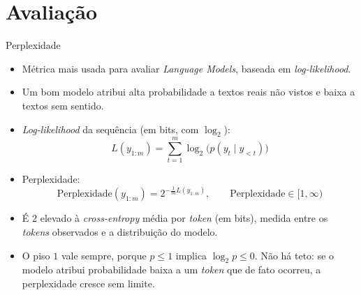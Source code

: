 \documentclass[aspectratio=169,xcolor=dvipsnames]{beamer}
\begin{document}
\section{Avaliação}

\begin{frame}{Perplexidade}
\begin{itemize}
    \item Métrica mais usada para avaliar \textit{Language Models}, baseada em \textit{log-likelihood}.
    \item Um bom modelo atribui alta probabilidade a textos reais não vistos e baixa a textos sem sentido.
    \item \textit{Log-likelihood} da sequência (em bits, com $\log_2$):
    \begin{equation*}
        L(y_{1:m}) = \sum_{t=1}^{m} \log_2\bigl(p(y_t \mid y_{<t})\bigr)
    \end{equation*}
    \item Perplexidade:
    \begin{equation*}
        \text{Perplexidade}(y_{1:m}) = 2^{-\frac{1}{m} L(y_{1:m})}, \qquad \text{Perplexidade} \in [1, \infty)
    \end{equation*}
    \item É $2$ elevado à \textit{cross-entropy} média por \textit{token} (em bits), medida entre os \textit{tokens} observados e a distribuição do modelo.
    \item O piso $1$ vale sempre, porque $p \le 1$ implica $\log_2 p \le 0$. Não há teto: se o modelo atribui probabilidade baixa a um \textit{token} que de fato ocorreu, a perplexidade cresce sem limite.
\end{itemize}
\end{frame}
\end{document}
